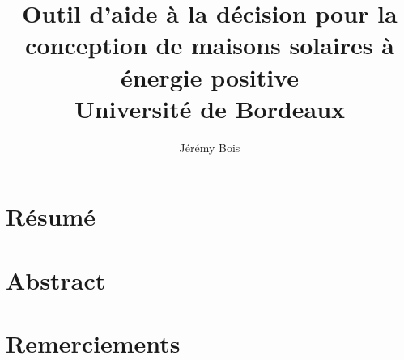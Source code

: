 \documentclass[11pt, oneside]{JeremyThesis}
\title{
    {Outil d’aide à la décision pour la conception de maisons solaires à énergie positive}\\
    {\large Université de Bordeaux}\\
    {}
}
\author{Jérémy Bois}
\date{}
\begin{document}



\begin{titlepage}
    \maketitle
    \thispagestyle{empty}
\end{titlepage}



\chapter*{Résumé}

\newpage
\chapter*{Abstract}

\clearpage
\chapter*{Remerciements}

\clearpage



{
    \hypersetup{linkcolor=ClassicBlack} %
    \tableofcontents
    \listoffigures
    \listoftables
    \listofalgorithms
}


\printnomenclature[3cm]
\thispagestyle{empty}




\clearpage
\footOn


\end{document}
